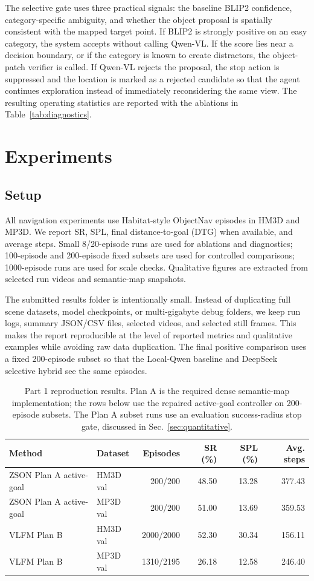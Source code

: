 \documentclass[10pt,twocolumn,letterpaper]{article}
\begin{document}
The selective gate uses three practical signals: the baseline BLIP2 confidence, category-specific ambiguity, and whether the object proposal is spatially consistent with the mapped target point. If BLIP2 is strongly positive on an easy category, the system accepts without calling Qwen-VL. If the score lies near a decision boundary, or if the category is known to create distractors, the object-patch verifier is called. If Qwen-VL rejects the proposal, the stop action is suppressed and the location is marked as a rejected candidate so that the agent continues exploration instead of immediately reconsidering the same view. The resulting operating statistics are reported with the ablations in Table~\ref{tab:diagnostics}.

\section{Experiments}
\subsection{Setup}
All navigation experiments use Habitat-style ObjectNav episodes in HM3D and MP3D. We report SR, SPL, final distance-to-goal (DTG) when available, and average steps. Small 8/20-episode runs are used for ablations and diagnostics; 100-episode and 200-episode fixed subsets are used for controlled comparisons; 1000-episode runs are used for scale checks. Qualitative figures are extracted from selected run videos and semantic-map snapshots.

The submitted results folder is intentionally small. Instead of duplicating full scene datasets, model checkpoints, or multi-gigabyte debug folders, we keep run logs, summary JSON/CSV files, selected videos, and selected still frames. This makes the report reproducible at the level of reported metrics and qualitative examples while avoiding raw data duplication. The final positive comparison uses a fixed 200-episode subset so that the Local-Qwen baseline and DeepSeek selective hybrid see the same episodes.

\begin{table}[t]
\centering
\footnotesize
\caption{Part 1 reproduction results. Plan A is the required dense semantic-map implementation; the rows below use the repaired active-goal controller on 200-episode subsets. The Plan A subset runs use an evaluation success-radius stop gate, discussed in Sec.~\ref{sec:quantitative}.}
\label{tab:part1}
\begin{tabular}{@{}llrrrr@{}}
\toprule
Method & Dataset & Episodes & SR (\%) & SPL (\%) & Avg. steps \\
\midrule
ZSON Plan A active-goal & HM3D val & 200/200 & 48.50 & 13.28 & 377.43 \\
ZSON Plan A active-goal & MP3D val & 200/200 & 51.00 & 13.69 & 359.53 \\
VLFM Plan B & HM3D val & 2000/2000 & 52.30 & 30.34 & 156.11 \\
VLFM Plan B & MP3D val & 1310/2195 & 26.18 & 12.58 & 246.40 \\
\bottomrule
\end{tabular}
\end{table}
\end{document}
